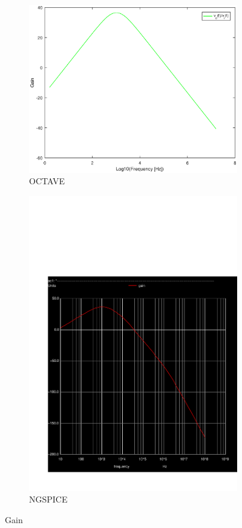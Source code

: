 
\begin{figure}[H] 
\centering
\begin{subfigure}{0.3\textwidth}
\includegraphics[width=\textwidth]{gain.eps}
\caption{OCTAVE}
\label{Octave_gain}
\end{subfigure}
\begin{subfigure}{0.3\textwidth}
\includegraphics[width=\textwidth]{Gain.pdf}
\caption{NGSPICE}
\label{Ngspice_gain}
\end{subfigure}
\caption{Gain}
\end{figure}


